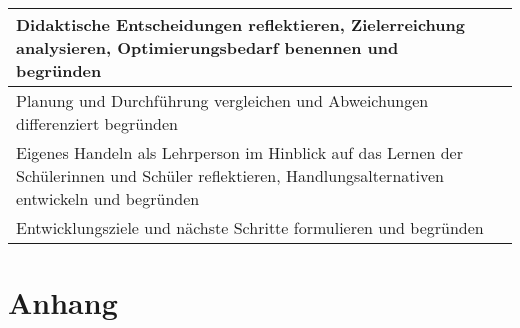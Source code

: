 \documentclass[
11pt,
captions=tableheading,
smallheadings,
headsepline,
footsepline, 
captions=tableheading,
parskip=half-,
]{scrartcl}
\begin{document}
\begin{landscape}
\begin{longtable}{@{}p{8cm}|p{16cm}@{}}
        Didaktische Entscheidungen reflektieren, Zielerreichung analysieren, Optimierungsbedarf benennen und begr\"unden                                          &                                    \\ \midrule
        Planung und Durchf\"uhrung vergleichen und Abweichungen differenziert begr\"unden                                                                         &                                    \\ \midrule
        Eigenes Handeln als Lehrperson im Hinblick auf das Lernen der Sch\"ulerinnen und Sch\"uler reflektieren, Handlungsalternativen entwickeln und begr\"unden &                                    \\ \midrule
        Entwicklungsziele und n\"achste Schritte formulieren und begr\"unden                                                                                      &                                    \\
    \end{longtable}

\end{landscape}






\clearpage
{}

\printbibliography
\clearpage
\section*{Anhang}


%





%


%
\end{document}

